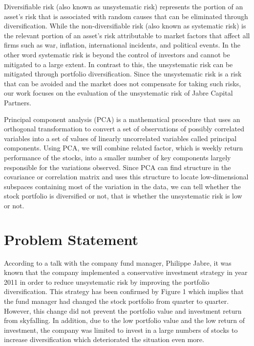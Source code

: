 \documentclass[oneside,12pt]{report}
\begin{document}
Diversifiable risk (also known as unsystematic risk) represents the portion of an asset’s risk that is associated with random causes that can be eliminated through diversification. While the non-diversifiable risk (also known as systematic risk) is the relevant portion of an asset’s risk attributable to market factors that affect all firms such as war, inflation, international incidents, and political events. In the other word systematic risk is beyond the control of investors and cannot be mitigated to a large extent. In contrast to this, the unsystematic risk can be mitigated through portfolio diversification. Since the unsystematic risk is a risk that can be avoided and the market does not compensate for taking such risks, our work focuses on the evaluation of the unsystematic risk of Jabre Capital Partners.

Principal component analysis (PCA) is a mathematical procedure that uses an orthogonal transformation to convert a set of observations of possibly correlated variables into a set of values of linearly uncorrelated variables called principal components. Using PCA, we will combine related factor, which is weekly return performance of the stocks, into a smaller number of key components largely responsible for the variations observed. Since PCA can find structure in the covariance or correlation matrix and uses this structure to locate low-dimensional subspaces containing most of the variation in the data, we can tell whether the stock portfolio is diversified or not, that is whether the unsystematic risk is low or not. 


\chapter{Problem Statement}\label{Problem Statement}
According to a talk with the company fund manager, Philippe Jabre, it was known that the company implemented a conservative investment strategy in year 2011 in order to reduce unsystematic risk by improving the portfolio diversification. This strategy has been confirmed by Figure 1 which implies that the fund manager had changed the stock portfolio from quarter to quarter. However, this change did not prevent the portfolio value and investment return from skyfalling. In addition, due to the low portfolio value and the low return of investment, the company was limited to invest in a large numbers of stocks to increase diversification which deteriorated the situation even more. 
\end{document}
